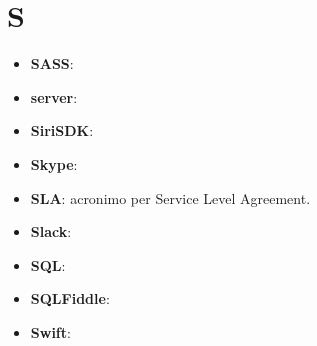 \section{S}
\begin{itemize}
	\item \textbf{SASS}:
	\item \textbf{server}:
	\item \textbf{SiriSDK}:
	\item \textbf{Skype}:
	\item \textbf{SLA}: acronimo per Service Level Agreement.
	\item \textbf{Slack}:
	\item \textbf{SQL}:
	\item \textbf{SQLFiddle}:
	\item \textbf{Swift}:
\end{itemize}